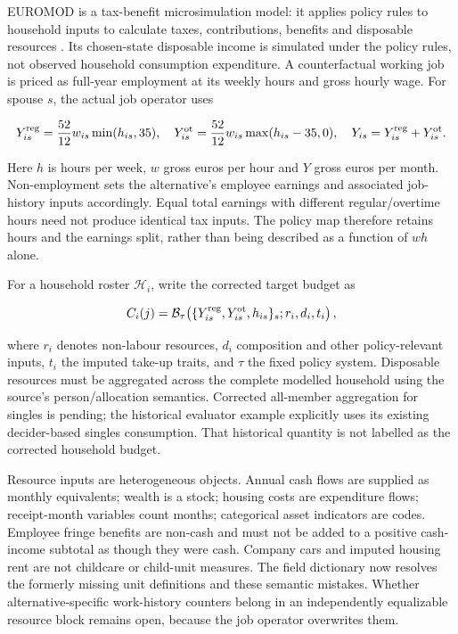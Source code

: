 \documentclass[11pt,a4paper]{article}
\begin{document}
EUROMOD is a tax-benefit microsimulation model: it applies policy rules to household inputs to calculate taxes, contributions, benefits and disposable resources \citep{sutherlandfigari2013}. Its chosen-state disposable income is simulated under the policy rules, not observed household consumption expenditure. A counterfactual working job is priced as full-year employment at its weekly hours and gross hourly wage. For spouse \(s\), the actual job operator uses

\[Y_{is}^{\rm reg}=\frac{52}{12}w_{is}\min(h_{is},35),\quad
Y_{is}^{\rm ot}=\frac{52}{12}w_{is}\max(h_{is}-35,0),\quad
Y_{is}=Y_{is}^{\rm reg}+Y_{is}^{\rm ot}.\]

Here \(h\) is hours per week, \(w\) gross euros per hour and \(Y\) gross euros per month. Non-employment sets the alternative's employee earnings and associated job-history inputs accordingly. Equal total earnings with different regular/overtime hours need not produce identical tax inputs. The policy map therefore retains hours and the earnings split, rather than being described as a function of \(wh\) alone.

For a household roster \(\mathcal H_i\), write the corrected target budget as

\[C_i(j)=\mathcal B_\tau\!\left(\{Y_{is}^{\rm reg},Y_{is}^{\rm ot},h_{is}\}_s;r_i,d_i,t_i\right),\]

where \(r_i\) denotes non-labour resources, \(d_i\) composition and other policy-relevant inputs, \(t_i\) the imputed take-up traits, and \(\tau\) the fixed policy system. Disposable resources must be aggregated across the complete modelled household using the source's person/allocation semantics. Corrected all-member aggregation for singles is pending; the historical evaluator example explicitly uses its existing decider-based singles consumption. That historical quantity is not labelled as the corrected household budget.

Resource inputs are heterogeneous objects. Annual cash flows are supplied as monthly equivalents; wealth is a stock; housing costs are expenditure flows; receipt-month variables count months; categorical asset indicators are codes. Employee fringe benefits are non-cash and must not be added to a positive cash-income subtotal as though they were cash. Company cars and imputed housing rent are not childcare or child-unit measures. The field dictionary now resolves the formerly missing unit definitions and these semantic mistakes. Whether alternative-specific work-history counters belong in an independently equalizable resource block remains open, because the job operator overwrites them.
\end{document}
